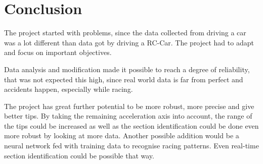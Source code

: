\chapter{Conclusion}
The project started with problems, since the data collected from driving a car was a lot different than data got by driving a RC-Car. The project had to adapt and focus on important objectives.

Data analysis and modification made it possible to reach a degree of reliability, that was not expected this high, since real world data is far from perfect and accidents happen, especially while racing.

The project has great further potential to be more robust, more precise and give better tips. By taking the remaining acceleration axis into account, the range of the tips could be increased as well as the section identification could be done even more robust by looking at more data. Another possible addition would be a neural network fed with training data to recognise racing patterns. Even real-time section identification could be possible that way. 